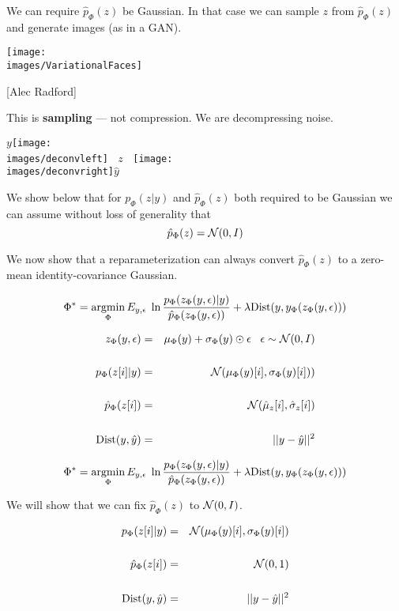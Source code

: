{{

We can require $\hat{p}_\Phi(z)$ be Gaussian.  In that case we can sample $z$ from $\hat{p}_\Phi(z)$ and generate images (as in a GAN).

\vfill
\centerline{\texttt{[image: \\images/VariationalFaces]}}
\centerline{[Alec Radford]}

\vfill
This is {\bf sampling} --- not compression.  We are decompressing noise.



\bigskip
\centerline{$y$\texttt{[image: \\images/deconvleft]} $\;\;z\;\;$ \texttt{[image: \\images/deconvright]}$\hat{y}$}

\bigskip
\bigskip
We show below that for $p_\Phi(z|y)$ and $\hat{p}_\Phi(z)$ both required to be Gaussian we can assume without loss
of generality that
\bigskip
$$\hat{p}_\Phi(z) = {\cal N}(0,I)$$


We now show that a reparameterization can always convert $\hat{p}_\Phi(z)$ to a zero-mean identity-covariance Gaussian.

\vfill
$$\Phi^* = \operatorname*{argmin}_\Phi E_{y,\epsilon}\;\ln \frac{p_\Phi(z_\Phi(y,\epsilon)|y)}{\hat{p}_\Phi(z_\Phi(y,\epsilon))} + \lambda \mathrm{Dist}(y,y_\Phi(z_\Phi(y,\epsilon)))$$

{\color{red}
\begin{eqnarray*}
z_\Phi(y,\epsilon) & = & \mu_\Phi(y) + \sigma_\Phi(y) \odot \epsilon\;\;\;\epsilon \sim {\cal N}(0,I) \\
\\
p_\Phi(z[i]|y) & = & {\cal N}(\mu_\Phi(y)[i],\sigma_\Phi(y)[i])) \\
\\
\hat{p}_\Phi(z[i]) & = & {\cal N}(\hat{\mu}_z[i],\hat{\sigma}_z[i]) \\
\\
\mathrm{Dist}(y,\hat{y}) & = & ||y-\hat{y}||^2
\end{eqnarray*}
}


$$\Phi^* = \operatorname*{argmin}_\Phi E_{y,\epsilon}\;\ln \frac{p_\Phi(z_\Phi(y,\epsilon)|y)}{\hat{p}_\Phi(z_\Phi(y,\epsilon))} + \lambda \mathrm{Dist}(y,y_\Phi(z_\Phi(y,\epsilon)))$$

\vfill
We will show that we can fix $\hat{p}_\Phi(z)$ to ${\cal N}(0,I)$.

{\color{red}
\begin{eqnarray*}
p_\Phi(z[i]|y) & = & {\cal N}(\mu_\Phi(y)[i],\sigma_\Phi(y)[i]) \\
\\
\hat{p}_\Phi(z[i]) & = & {\cal N}(0,1) \\
\\
\mathrm{Dist}(y,\hat{y}) & = & ||y-\hat{y}||^2
\end{eqnarray*}
}


}}
